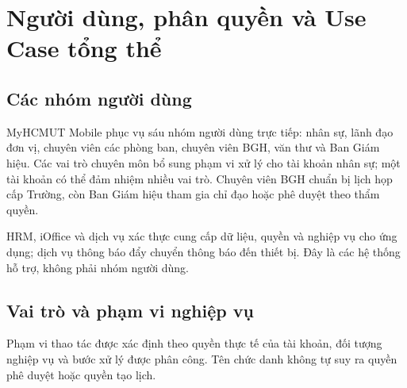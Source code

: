 \section{Người dùng, phân quyền và Use Case tổng thể}
\label{sec:nguoidung_rbac_usecase}

\subsection{Các nhóm người dùng}
\label{subsec:nhom_nguoidung}

MyHCMUT Mobile phục vụ sáu nhóm người dùng trực tiếp: nhân sự, lãnh đạo đơn vị, chuyên viên các phòng ban, chuyên viên BGH, văn thư và Ban Giám hiệu. Các vai trò chuyên môn bổ sung phạm vi xử lý cho tài khoản nhân sự; một tài khoản có thể đảm nhiệm nhiều vai trò. Chuyên viên BGH chuẩn bị lịch họp cấp Trường, còn Ban Giám hiệu tham gia chỉ đạo hoặc phê duyệt theo thẩm quyền.

HRM, iOffice và dịch vụ xác thực cung cấp dữ liệu, quyền và nghiệp vụ cho ứng dụng; dịch vụ thông báo đẩy chuyển thông báo đến thiết bị. Đây là các hệ thống hỗ trợ, không phải nhóm người dùng.

\subsection{Vai trò và phạm vi nghiệp vụ}
\label{subsec:nguyentac_phanquyen}

Phạm vi thao tác được xác định theo quyền thực tế của tài khoản, đối tượng nghiệp vụ và bước xử lý được phân công. Tên chức danh không tự suy ra quyền phê duyệt hoặc quyền tạo lịch.

